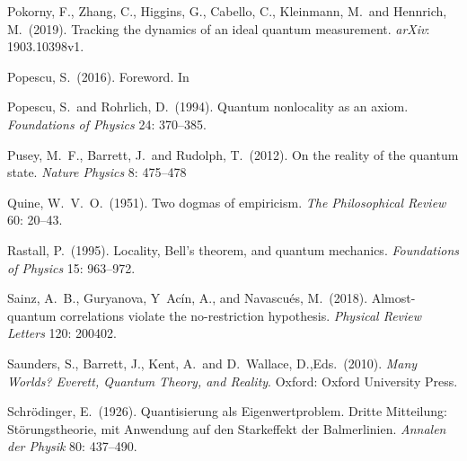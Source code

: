 \documentclass[12pt]{article}
\numberwithin{equation}{section}
\begin{document}
\begin{thebibliography}{}
 Pokorny, F., Zhang, C., Higgins, G., Cabello, C., Kleinmann, M.\ and Hennrich, M.\  (2019). Tracking the dynamics of an ideal quantum measurement. \emph{arXiv}: 1903.10398v1.

 Popescu, S.\ (2016). Foreword. In \citet[pp.\ v--vi]{Bub 2016}

 Popescu, S.\ and Rohrlich, D.\ (1994). Quantum nonlocality as an axiom. \emph{Foundations of Physics} 24: 370--385.

 Pusey, M.\ F., Barrett, J.\ and Rudolph, T.\ (2012). On the reality of the quantum state. \emph{Nature Physics} 8: 475--478

 Quine, W.\ V.\ O.\ (1951). Two dogmas of empiricism. \emph{The Philosophical Review} 60: 20--43.

 Rastall, P.\ (1995). Locality, Bell's theorem, and quantum mechanics. \emph{ Foundations of Physics} 15: 963--972.


 Sainz, A.\ B., Guryanova, Y\, Ac\'in, A., and Navascu\'es, M.\  (2018). Almost-quantum correlations violate the no-restriction hypothesis. \emph{Physical Review Letters} 120: 200402.

 Saunders, S., Barrett, J., Kent, A.\ and D.\ Wallace, D.,Eds.\ (2010). \emph{Many Worlds? Everett, Quantum Theory, and Reality}. Oxford: Oxford University Press.


 Schr\"odinger, E.\ (1926).  Quantisierung als Eigenwertproblem.  Dritte Mitteilung: St\"orungstheorie, mit Anwendung auf den Starkeffekt der Balmerlinien. \emph{Annalen der Physik}  80: 437--490. 



\end{thebibliography}
\end{document}
